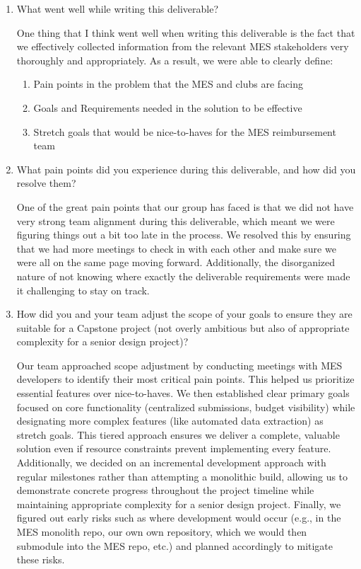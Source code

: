 \documentclass{article}
\begin{document}
\begin{enumerate}
    \item What went well while writing this deliverable? 
    
    One thing that I think went well when writing this deliverable is the fact that we effectively collected information from the relevant MES stakeholders very thoroughly and appropriately. As a result, we were able to clearly define:
    \begin{enumerate}
        \item Pain points in the problem that the MES and clubs are facing 
        \item Goals and Requirements needed in the solution to be effective
        \item Stretch goals that would be nice-to-haves for the MES reimbursement team
    \end{enumerate}

    \item What pain points did you experience during this deliverable, and how
    did you resolve them?
    
    One of the great pain points that our group has faced is that we did not have very strong team alignment during this deliverable, which meant we were figuring things
    out a bit too late in the process. We resolved this by ensuring that we had more meetings to check in with each other and make sure we were all on the same page moving forward. 
    Additionally, the disorganized nature of not knowing where exactly the deliverable requirements were made it challenging to stay on track.

    \item How did you and your team adjust the scope of your goals to ensure
    they are suitable for a Capstone project (not overly ambitious but also of
    appropriate complexity for a senior design project)?

    Our team approached scope adjustment by conducting meetings with MES developers to identify their most critical pain points. This helped us prioritize essential features over nice-to-haves.
    We then established clear primary goals focused on core functionality (centralized submissions, budget visibility) while designating more complex features (like automated data extraction) as stretch goals.
    This tiered approach ensures we deliver a complete, valuable solution even if resource constraints prevent implementing every feature.
    Additionally, we decided on an incremental development approach with regular milestones rather than attempting a monolithic build, allowing us to demonstrate concrete progress throughout the project timeline while maintaining appropriate complexity for a senior design project.
    Finally, we figured out early risks such as where development would occur (e.g., in the MES monolith repo, our own own repository, which we would then submodule into the MES repo, etc.) and planned accordingly to mitigate these risks.
\end{enumerate}
\end{document}
